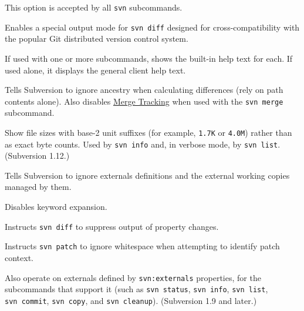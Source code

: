 \begin{description}
This option is accepted by all \texttt{svn} subcommands.
\item[\protect\phantomsection\label{svn.ref.svn.sw.git}{}\texttt{-\/-git}]
Enables a special output mode for \texttt{svn\ diff} designed for
cross-compatibility with the popular Git distributed version control
system.
\item[\protect\phantomsection\label{svn.ref.svn.sw.help}{}\texttt{-\/-help}
(\texttt{-h}, \texttt{-?})]
If used with one or more subcommands, shows the built-in help text for
each. If used alone, it displays the general client help text.
\item[\protect\phantomsection\label{svn.ref.svn.sw.ignore_ancestry}{}\texttt{-\/-ignore-ancestry}]
Tells Subversion to ignore ancestry when calculating differences (rely
on path contents alone). Also disables
\hyperref[svn.branchmerge.basicmerging.mergetracking]{Merge Tracking}
when used with the \texttt{svn\ merge} subcommand.
\item[\protect\phantomsection\label{svn.ref.svn.sw.human_readable}{}\texttt{-\/-human-readable}
(\texttt{-H})]
Show file sizes with base-2 unit suffixes (for example, \texttt{1.7K} or
\texttt{4.0M}) rather than as exact byte counts. Used by \texttt{svn\ info}
and, in verbose mode, by \texttt{svn\ list}. (Subversion 1.12.)
\item[\protect\phantomsection\label{svn.ref.svn.sw.ignore_externals}{}\texttt{-\/-ignore-externals}]
Tells Subversion to ignore externals definitions and the external
working copies managed by them.
\item[\protect\phantomsection\label{svn.ref.svn.sw.ignore_keywords}{}\texttt{-\/-ignore-keywords}]
Disables keyword expansion.
\item[\protect\phantomsection\label{svn.ref.svn.sw.ignore_properties}{}\texttt{-\/-ignore-properties}]
Instructs \texttt{svn\ diff} to suppress output of property changes.
\item[\protect\phantomsection\label{svn.ref.svn.sw.ignore_whitespace}{}\texttt{-\/-ignore-whitespace}]
Instructs \texttt{svn\ patch} to ignore whitespace when attempting to
identify patch context.
\item[\protect\phantomsection\label{svn.ref.svn.sw.include_externals}{}\texttt{-\/-include-externals}]
Also operate on externals defined by \texttt{svn:externals} properties,
for the subcommands that support it (such as \texttt{svn\ status},
\texttt{svn\ info}, \texttt{svn\ list}, \texttt{svn\ commit},
\texttt{svn\ copy}, and \texttt{svn\ cleanup}). (Subversion 1.9 and
later.)

\end{description}
